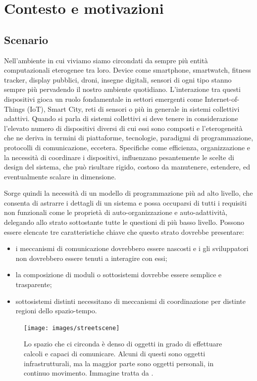 \chapter{Contesto e motivazioni}
\section{Scenario}
Nell'ambiente in cui viviamo siamo circondati da sempre più entità
computazionali eterogenee tra loro. Device come smartphone, smartwatch, fitness
tracker, display pubblici, droni, insegne digitali, sensori di ogni tipo stanno
sempre più pervadendo il nostro ambiente quotidiano. L'interazione tra questi
dispositivi gioca un ruolo fondamentale in settori emergenti come
Internet-of-Things (IoT), Smart City, reti di sensori o più in generale in
sistemi collettivi adattivi. Quando si parla di sistemi collettivi si deve
tenere in considerazione l'elevato numero di dispositivi diversi di cui essi
sono composti e l'eterogeneità che ne deriva in termini di piattaforme,
tecnologie, paradigmi di programmazione, protocolli di comunicazione,
eccetera. Specifiche come efficienza, organizzazione e la necessità di
coordinare i dispositivi, influenzano pesantemente le scelte di design del
sistema, che può risultare rigido, costoso da manutenere, estendere, ed
eventualmente scalare in dimensione.

Sorge quindi la necessità di un modello di programmazione più ad alto livello,
che consenta di astrarre i dettagli di un sistema e possa occuparsi di tutti i
requisiti non funzionali come le proprietà di auto-organizzazione e
auto-adattività, delegando allo strato sottostante tutte le questioni di più basso livello. Possono essere elencate tre caratteristiche
chiave che questo strato dovrebbe presentare\cite{DBLP:journals/computer/BealPV15
}:
\begin{itemize}
\item i meccanismi di comunicazione dovrebbero essere nascosti e i gli
  sviluppatori non dovrebbero essere tenuti a interagire con essi;
\item la composizione di moduli o sottosistemi dovrebbe essere semplice e
  trasparente;
\item sottosistemi distinti necessitano di meccanismi di coordinazione per
  distinte regioni dello spazio-tempo.
\end{itemize}

\begin{figure}
  \centering
  \texttt{[image: images/streetscene]}
  \caption{Lo spazio che ci circonda è denso di oggetti in grado di effettuare
    calcoli e capaci di comunicare. Alcuni di questi sono oggetti
    infrastrutturali, ma la maggior parte sono oggetti personali, in continuo
    movimento. Immagine tratta da \cite{Protelis}.}
  \label{fig:streetscene}
\end{figure}

